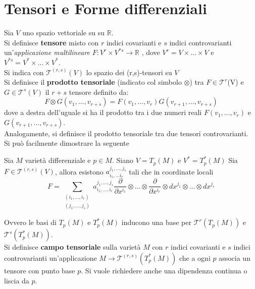 \section{Tensori e Forme differenziali}
Sia $V$ uno spazio vettoriale su su $\mathbb{R}$.\\
Si definisce \textbf{tensore} misto con $r$ indici covarianti e $s$ indici
controvarianti un'\emph{applicazione multilineare} $F : V^r \times V^{*s} \to
\mathbb{R}$ , dove $V^r = V \times \dots \times V$ e
$V^{*s} =  V^* \times \dots \times V^*$.\\

Si indica con $\mathcal{T}^{(r,s)}(V)$ lo spazio dei (r,s)-tensori su $V$\\

Si definisce il \textbf{prodotto tensoriale} (indicato col simbolo $\otimes$) tra
$F \in \mathcal{T}^r$(V) e $G \in \mathcal{T}^s(V)$ il $r+s$ tensore definito da:
$$ F \otimes G (v_1,\dots,v_{r+s}) = F(v_1,\dots,v_r)G(v_{r+1},\dots,v_{r+s})$$
dove a destra dell'uguale si ha il prodotto tra i due numeri reali
$F(v_1,\dots,v_r)$ e $G(v_{r+1},\dots,v_{r+s})$.\\
Analogamente, si definisce il prodotto tensoriale tra due tensori controvarianti.\\

Si può facilmente dimostrare la seguente
\begin{proposition}\label{prop:base1}
   Sia $M$ varietà differenziale e $p \in M$. Siano $V = T_p(M)$ e $V^* = T_p^*(M)$
   Sia $F \in \mathcal{T}^{(r,s)}(V)$, allora esistono $a_{i_1,\dots i_r}^{j_1,\dots,j_s}$
   tali che in coordinate locali\\
   $$
      F = \sum_{\substack{(i_1,\dots, i_r)\\(j_1,\dots,j_s)}}
         a_{i_1,\dots, i_r}^{j_1,\dots,j_s}
         \frac{\partial}{\partial x^{i_1}} \otimes \dots
         \otimes \frac{\partial}{\partial x^{i_r}}
         \otimes dx^{j_1} \otimes \dots \otimes dx^{j_s}
   $$
\end{proposition}
Ovvero le basi di $T_p(M)$ e $T_p^*(M)$ inducono una base per $\mathcal{T}^r(T_p(M))$
e $\mathcal{T}^s(T_p^*(M))$.\\

Si definisce \textbf{campo tensoriale} sulla varietà $M$ con $r$ indici covarianti
e $s$ indici controvarianti un'applicazione $ M \to \mathcal{T}^{(r,s)}(T_p^*(M)) $
che a ogni $p$ associa un tensore con punto base $p$. Si vuole richiedere anche
una dipendenza continua o liscia da $p$.\\

